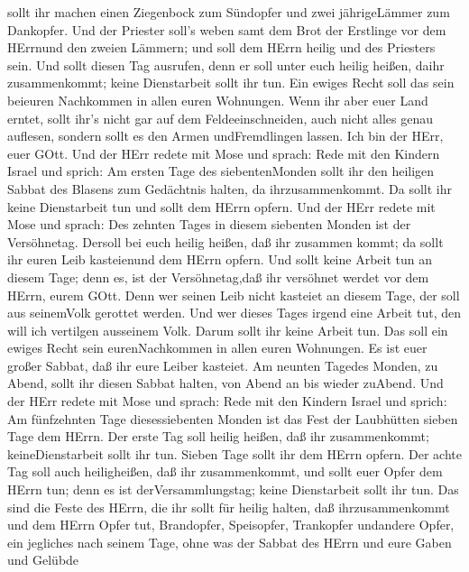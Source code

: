 sollt ihr machen einen Ziegenbock zum Sündopfer und zwei jährigeLämmer
zum Dankopfer.  Und der Priester soll's weben samt dem Brot
der Erstlinge vor dem HErrnund den zweien Lämmern; und soll dem HErrn
heilig und des Priesters sein.  Und sollt diesen Tag
ausrufen, denn er soll unter euch heilig heißen, daihr zusammenkommt;
keine Dienstarbeit sollt ihr tun. Ein ewiges Recht soll das sein
beieuren Nachkommen in allen euren Wohnungen.  Wenn ihr
aber euer Land erntet, sollt ihr's nicht gar auf dem Feldeeinschneiden,
auch nicht alles genau auflesen, sondern sollt es den Armen
undFremdlingen lassen. Ich bin der HErr, euer GOtt.  Und
der HErr redete mit Mose und sprach:  Rede mit den Kindern
Israel und sprich: Am ersten Tage des siebentenMonden sollt ihr den
heiligen Sabbat des Blasens zum Gedächtnis halten, da ihrzusammenkommt.
 Da sollt ihr keine Dienstarbeit tun und sollt dem HErrn
opfern.  Und der HErr redete mit Mose und sprach:
 Des zehnten Tages in diesem siebenten Monden ist der
Versöhnetag. Dersoll bei euch heilig heißen, daß ihr zusammen kommt; da
sollt ihr euren Leib kasteienund dem HErrn opfern.  Und
sollt keine Arbeit tun an diesem Tage; denn es, ist der Versöhnetag,daß
ihr versöhnet werdet vor dem HErrn, eurem GOtt.  Denn wer
seinen Leib nicht kasteiet an diesem Tage, der soll aus seinemVolk
gerottet werden.  Und wer dieses Tages irgend eine Arbeit
tut, den will ich vertilgen ausseinem Volk.  Darum sollt
ihr keine Arbeit tun. Das soll ein ewiges Recht sein eurenNachkommen in
allen euren Wohnungen.  Es ist euer großer Sabbat, daß ihr
eure Leiber kasteiet. Am neunten Tagedes Monden, zu Abend, sollt ihr
diesen Sabbat halten, von Abend an bis wieder zuAbend.  Und
der HErr redete mit Mose und sprach:  Rede mit den Kindern
Israel und sprich: Am fünfzehnten Tage diesessiebenten Monden ist das
Fest der Laubhütten sieben Tage dem HErrn.  Der erste Tag
soll heilig heißen, daß ihr zusammenkommt; keineDienstarbeit sollt ihr
tun.  Sieben Tage sollt ihr dem HErrn opfern. Der achte Tag
soll auch heiligheißen, daß ihr zusammenkommt, und sollt euer Opfer dem
HErrn tun; denn es ist derVersammlungstag; keine Dienstarbeit sollt ihr
tun.  Das sind die Feste des HErrn, die ihr sollt für
heilig halten, daß ihrzusammenkommt und dem HErrn Opfer tut, Brandopfer,
Speisopfer, Trankopfer undandere Opfer, ein jegliches nach seinem Tage,
 ohne was der Sabbat des HErrn und eure Gaben und Gelübde

